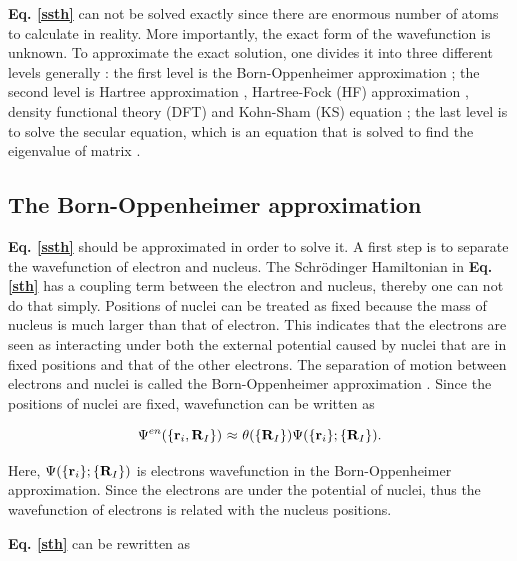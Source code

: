 \documentclass[a4paper, 12pt, titlepage,oneside,drop]{kthesis}
\begin{document}
\textbf{Eq. \ref{ssth}} can not be solved exactly since there are enormous number of atoms to calculate in reality. More importantly, the exact form of the wavefunction is unknown.
To approximate the exact solution, one divides it into three different levels generally \cite{martin2004electronic, Cottenierwien2k}: the first level is the Born-Oppenheimer approximation \cite{bornoppenheimer}; the second
level is Hartree approximation \cite{hartreeapproximation},
Hartree-Fock (HF) approximation \cite{hartreefockapproximation}, density functional theory (DFT) \cite{hohenberg1964inhomogeneous} and Kohn-Sham (KS) equation \cite{kohn1965self}; the last level is to solve the secular 
equation, which is an equation that is solved to find the eigenvalue of matrix \cite{martin2004electronic, Cottenierwien2k}.

\subsection{The Born-Oppenheimer approximation}
\label{ch:boa}

\textbf{Eq. \ref{ssth}} should be approximated in order to solve it. A first step is to separate the wavefunction of electron and nucleus. The Schrödinger Hamiltonian in \textbf{Eq. \ref{sth}} has a coupling term between
the electron and nucleus, thereby one can not do that simply. Positions of nuclei can be treated as fixed because the mass of nucleus is much larger than that of electron. This indicates that the electrons are seen as interacting under
both the external potential caused by nuclei that are in fixed positions and that of the other electrons. The separation of motion between electrons and nuclei is called the Born-Oppenheimer approximation \cite{bornoppenheimer}.
Since the positions of nuclei are fixed, wavefunction can be written as

\begin{equation}\label{nwf}
{\Psi^{en}(\{ {\textbf r}_{i}, {\textbf R}_{I} \})} \   {\approx} \  {\theta(\{{\textbf R}_{I}\})} {\Psi(\{\textbf{r}_{i}\}; \{{\textbf R}_{I}\})}.
\end{equation}

Here, ${\Psi(\{\textbf{r}_{i}\}; \{{\textbf R}_{I}\})}$  is electrons wavefunction in the Born-Oppenheimer approximation. Since the electrons are under the potential of nuclei, thus the wavefunction of 
electrons is related with the nucleus positions. 
 
\textbf{Eq. \ref{sth}} can be rewritten as
\end{document}
